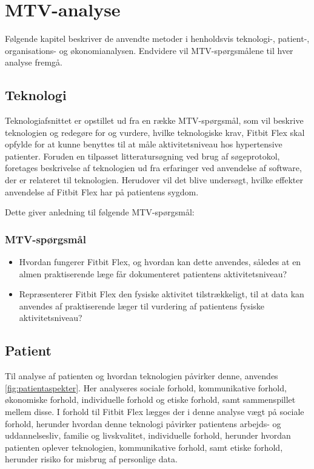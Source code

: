 \chapter{MTV-analyse}
Følgende kapitel beskriver de anvendte metoder i henholdsvis teknologi-, patient-, organisations- og økonomianalysen. Endvidere vil MTV-spørgsmålene til hver analyse fremgå. 

\section{Teknologi}\label{sec:metode_tek}
Teknologiafsnittet er opstillet ud fra en række MTV-spørgsmål, som vil beskrive teknologien og redegøre for og vurdere, hvilke teknologiske krav, Fitbit Flex skal opfylde for at kunne benyttes til at måle aktivitetsniveau hos hypertensive patienter. 
Foruden en tilpasset litteratursøgning ved brug af søgeprotokol, foretages beskrivelse af teknologien ud fra erfaringer ved anvendelse af software, der er relateret til teknologien.   
Herudover vil det blive undersøgt, hvilke effekter anvendelse af Fitbit Flex har på patientens sygdom.
 
\noindent
Dette giver anledning til følgende MTV-spørgsmål: 
\subsection{MTV-spørgsmål}
\begin{itemize}
\item Hvordan fungerer Fitbit Flex, og hvordan kan dette anvendes, således at en almen praktiserende læge får dokumenteret patientens aktivitetsniveau?
\item Repræsenterer Fitbit Flex den fysiske aktivitet tilstrækkeligt, til at data kan anvendes af praktiserende læger til vurdering af patientens fysiske aktivitetsniveau?
\end{itemize}

\section{Patient}\label{sec:metode_pat}
Til analyse af patienten og hvordan teknologien påvirker denne, anvendes \autoref{fig:patientaspekter}. Her analyseres sociale forhold, kommunikative forhold, økonomiske forhold, individuelle forhold og etiske forhold, samt sammenspillet mellem disse. I forhold til Fitbit Flex lægges der i denne analyse vægt på sociale forhold, herunder hvordan denne teknologi påvirker patientens arbejds- og uddannelsesliv, familie og livskvalitet, individuelle forhold, herunder hvordan patienten oplever teknologien, kommunikative forhold, samt etiske forhold, herunder risiko for misbrug af personlige data. 


